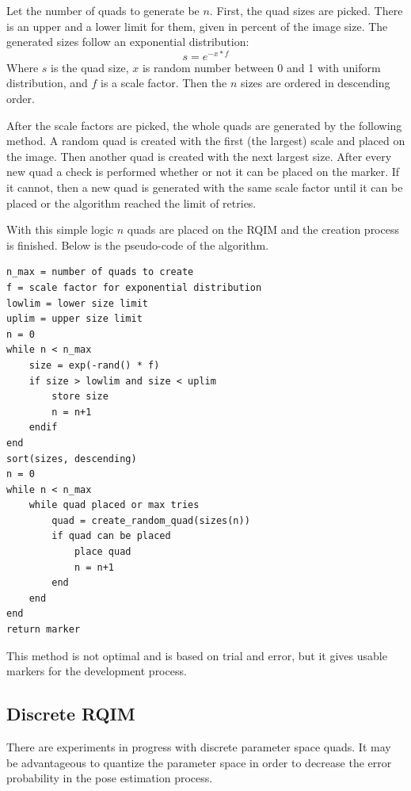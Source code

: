 Let the number of quads to generate be $n$.
First, the quad sizes are picked.
There is an upper and a lower limit for them, given in percent of the image size.
The generated sizes follow an exponential distribution:
\begin{equation}
	s = e^{-x*f}
\end{equation}
Where $s$ is the quad size, $x$ is random number between 0 and 1 with uniform distribution, and $f$ is a scale factor.
Then the $n$ sizes are ordered in descending order.

After the scale factors are picked, the whole quads are generated by the following method.
A random quad is created with the first (the largest) scale and placed on the image.
Then another quad is created with the next largest size.
After every new quad a check is performed whether or not it can be placed on the marker.
If it cannot, then a new quad is generated with the same scale factor until it can be placed or the algorithm reached the limit of retries.

With this simple logic $n$ quads are placed on the RQIM and the creation process is finished.
Below is the pseudo-code of the algorithm.

\begin{lstlisting}
n_max = number of quads to create
f = scale factor for exponential distribution
lowlim = lower size limit
uplim = upper size limit
n = 0
while n < n_max
    size = exp(-rand() * f)
    if size > lowlim and size < uplim
        store size
        n = n+1
    endif
end
sort(sizes, descending)
n = 0
while n < n_max
    while quad placed or max tries
        quad = create_random_quad(sizes(n))
        if quad can be placed
            place quad
            n = n+1
        end
    end
end
return marker
\end{lstlisting}

This method is not optimal and is based on trial and error, but it gives usable markers for the development process.

\subsection{Discrete RQIM}

There are experiments in progress with discrete parameter space quads.
It may be advantageous to quantize the parameter space in order to decrease the error probability in the pose estimation process.


